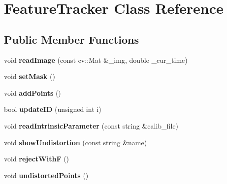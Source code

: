 \hypertarget{classFeatureTracker}{}\section{Feature\+Tracker Class Reference}
\label{classFeatureTracker}
\subsection*{Public Member Functions}
\begin{DoxyCompactItemize}
\item 
\mbox{\label{classFeatureTracker_addbf26301fb0b3fbe799367c1f0df3ed}} 
void {\bfseries read\+Image} (const cv\+::\+Mat \&\+\_\+img, double \+\_\+cur\+\_\+time)
\item 
\mbox{\label{classFeatureTracker_af95c8b98f639c552a4a3b7aa014859e5}} 
void {\bfseries set\+Mask} ()
\item 
\mbox{\label{classFeatureTracker_a08eada83c5ceaec0aabda8e0956469d2}} 
void {\bfseries add\+Points} ()
\item 
\mbox{\label{classFeatureTracker_a14aaa0b69d96a18e2cec8ba71f1d6221}} 
bool {\bfseries update\+ID} (unsigned int i)
\item 
\mbox{\label{classFeatureTracker_ad8c8512382af4917a125770b24e3ab7a}} 
void {\bfseries read\+Intrinsic\+Parameter} (const string \&calib\+\_\+file)
\item 
\mbox{\label{classFeatureTracker_af76b1ddf67a3b0b5f3bf47132c112948}} 
void {\bfseries show\+Undistortion} (const string \&name)
\item 
\mbox{\label{classFeatureTracker_aa25fdfbb607824acbf431fa90036b4bd}} 
void {\bfseries reject\+WithF} ()
\item 
\mbox{\label{classFeatureTracker_a73884e00cbbfdbd69b7748706223377e}} 
void {\bfseries undistorted\+Points} ()
\end{DoxyCompactItemize}

